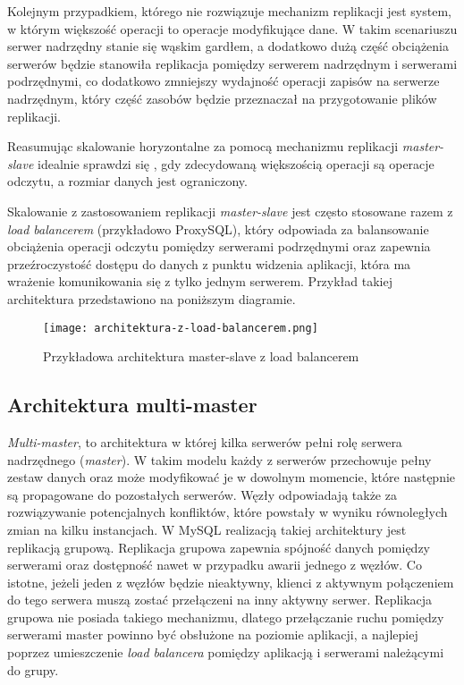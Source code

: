 Kolejnym przypadkiem, którego nie rozwiązuje mechanizm replikacji jest system, w którym większość operacji to operacje modyfikujące dane. W takim scenariuszu serwer nadrzędny stanie się wąskim gardłem, a dodatkowo dużą część obciążenia serwerów będzie stanowiła replikacja pomiędzy serwerem nadrzędnym i serwerami podrzędnymi, co dodatkowo zmniejszy wydajność operacji zapisów na serwerze nadrzędnym, który część zasobów będzie przeznaczał na przygotowanie plików replikacji.

Reasumując skalowanie horyzontalne za pomocą mechanizmu replikacji \textit{master-slave} idealnie sprawdzi się , gdy zdecydowaną większością operacji są operacje odczytu, a rozmiar danych jest ograniczony.

Skalowanie z zastosowaniem replikacji \textit{master-slave} jest często stosowane razem z \textit{load balancerem} (przykładowo ProxySQL), który odpowiada za balansowanie obciążenia operacji odczytu pomiędzy serwerami podrzędnymi oraz zapewnia przeźroczystość dostępu do danych z punktu widzenia aplikacji, która ma wrażenie komunikowania się z tylko jednym serwerem. Przykład takiej architektura przedstawiono na poniższym diagramie.

\begin{figure}[!h]
	\caption{Przykładowa architektura master-slave z load balancerem}
	\centering
	\texttt{[image: architektura-z-load-balancerem.png]}
	\label{fig:label}
\end{figure}

\subsection{Architektura multi-master}
\textit{Multi-master}, to architektura w której kilka serwerów pełni rolę serwera nadrzędnego (\textit{master}). W takim modelu każdy z serwerów przechowuje pełny zestaw danych oraz może modyfikować je w dowolnym momencie, które następnie są propagowane do pozostałych serwerów. Węzły odpowiadają także za rozwiązywanie potencjalnych konfliktów, które powstały w wyniku równoległych zmian na kilku instancjach. W MySQL realizacją takiej architektury jest replikacją grupową. Replikacja grupowa zapewnia spójność danych pomiędzy serwerami oraz dostępność nawet w przypadku awarii jednego z węzłów. Co istotne, jeżeli jeden z węzłów będzie nieaktywny, klienci z aktywnym połączeniem do tego serwera muszą zostać przełączeni na inny aktywny serwer. Replikacja grupowa nie posiada takiego mechanizmu, dlatego przełączanie ruchu pomiędzy serwerami master powinno być obsłużone na poziomie aplikacji, a najlepiej poprzez umieszczenie \textit{load balancera} pomiędzy aplikacją i serwerami należącymi do grupy.

